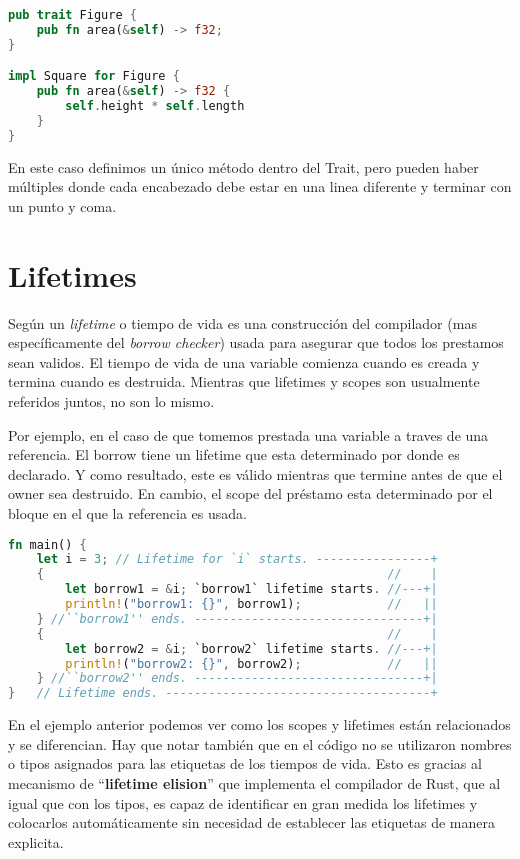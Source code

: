 \begin{lstlisting}[language=Rust]
pub trait Figure {
    pub fn area(&self) -> f32;
}

impl Square for Figure {
    pub fn area(&self) -> f32 {
        self.height * self.length
    }
}
\end{lstlisting}

En este caso definimos un único método dentro del Trait, pero pueden haber múltiples donde cada encabezado debe estar en una linea diferente y terminar con un punto y coma.

\section{Lifetimes}

Según  un \textit{lifetime} o tiempo de vida es una construcción del compilador (mas específicamente del \textit{borrow checker}) usada para asegurar que todos los prestamos sean validos. El tiempo de vida de una variable comienza cuando es creada y termina cuando es destruida. Mientras que lifetimes y scopes son usualmente referidos juntos, no son lo mismo.

Por ejemplo, en el caso de que tomemos prestada una variable a traves de una referencia. El borrow tiene un lifetime que esta determinado por donde es declarado. Y como resultado, este es válido mientras que termine antes de que el owner sea destruido. En cambio, el scope del préstamo esta determinado por el bloque en el que la referencia es usada.

\begin{lstlisting}[language=Rust]
fn main() {
    let i = 3; // Lifetime for `i` starts. ----------------+
    {                                                //    |
        let borrow1 = &i; `borrow1` lifetime starts. //---+|
        println!("borrow1: {}", borrow1);            //   ||
    } //``borrow1'' ends. --------------------------------+|
    {                                                //    |
        let borrow2 = &i; `borrow2` lifetime starts. //---+|
        println!("borrow2: {}", borrow2);            //   ||
    } //``borrow2'' ends. --------------------------------+|
}   // Lifetime ends. -------------------------------------+

\end{lstlisting}

En el ejemplo anterior podemos ver como los scopes y lifetimes están relacionados y se diferencian. Hay que notar también que en el código no se utilizaron nombres o tipos asignados para las etiquetas de los tiempos de vida. Esto es gracias al mecanismo de ``\textbf{lifetime elision}'' que implementa el compilador de Rust, que al igual que con los tipos, es capaz de identificar en gran medida los lifetimes y colocarlos automáticamente sin necesidad de establecer las etiquetas de manera explicita.

